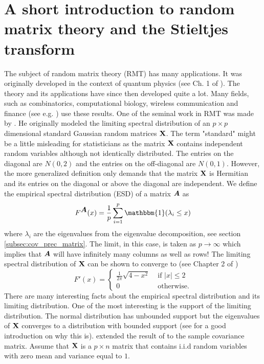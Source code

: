 \documentclass[oneside]{book}\usepackage{knitr}
\begin{document}
\section{A short introduction to random matrix theory and the Stieltjes transform}
The subject of random matrix theory (RMT) has many applications. 
It was originally developed in the context of quantum physics (see Ch. 1 of \citet{mehta2004random}). 
The theory and its applications have since then developed quite a lot. 
Many fields, such as combinatorics, computational biology, wireless communication and finance (see e.g. \citet{livan2018introduction}) use these results. 
One of the seminal work in RMT was made by \citet{wigner1967random}. 
He originally modeled the limiting spectral distribution of an $p \times p$ dimensional standard Gaussian random matrices $\mathbf{X}$.
The term "standard" might be a little misleading for statisticians as the matrix $\mathbf{X}$ contains independent random variables although not identically distributed.
The entries on the diagonal are $N(0,2)$ and the entries on the off-diagonal are $N(0,1)$.
However, the more generalized definition only demands that the matrix $\mathbf{X}$ is Hermitian and its entries on the diagonal or above the diagonal are independent. 
We define the empirical spectral distribution (ESD) of a matrix $\mbox{\boldmath$A$}$ as
$$
F^{\bA}(x)= \frac{1}{p} \sum_{i=1}^p \mathbbm{1}(\lambda_i \leq x)
$$ 
where $\lambda_i$ are the eigenvalues from the eigenvalue decomposition, see section \ref{subsec:cov_prec_matrix}. 
The limit, in this case, is taken as $p \rightarrow \infty$ which implies that $\mbox{\boldmath$A$}$ will have infinitely many columns as well as rows!
The limiting spectral distribution of $\mathbf{X}$ can be shown to converge to (see Chapter 2 of \citet{bai2010spectral})
$$
F'(x) = \begin{cases}
\frac{1}{2\pi} \sqrt{4-x^2} & \text{ if } |x|\leq 2 \\
0 & \text{ otherwise.}
\end{cases}
$$
There are many interesting facts about the empirical spectral distribution and its limiting distribution. 
One of the most interesting is the support of the limiting distribution. 
The normal distribution has unbounded support but the eigenvalues of $\mathbf{X}$ converges to a distribution with bounded support (see \citet{livan2018introduction} for a good introduction on why this is). 
\citet{zbMATH03244317} extended the result of \citet{wigner1967random} to the sample covariance matrix. 
Assume that $\mathbf{X}$ is a $p \times n$ matrix that contains i.i.d random variables with zero mean and variance equal to $1$.
\end{document}
